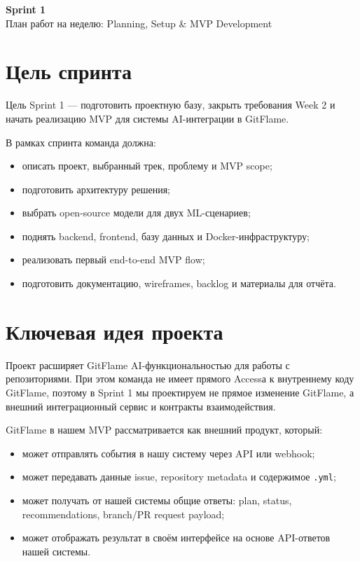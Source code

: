 \documentclass[12pt,a4paper]{article}
\begin{document}

\begin{center}
    {\LARGE \textbf{Sprint 1}}\\[6pt]
    {\large План работ на неделю: Planning, Setup \& MVP Development}
\end{center}

\section{Цель спринта}

Цель Sprint 1 --- подготовить проектную базу, закрыть требования Week 2 и начать реализацию MVP для системы AI-интеграции в GitFlame.

В рамках спринта команда должна:

\begin{itemize}
    \item описать проект, выбранный трек, проблему и MVP scope;
    \item подготовить архитектуру решения;
    \item выбрать open-source модели для двух ML-сценариев;
    \item поднять backend, frontend, базу данных и Docker-инфраструктуру;
    \item реализовать первый end-to-end MVP flow;
    \item подготовить документацию, wireframes, backlog и материалы для отчёта.
\end{itemize}

\section{Ключевая идея проекта}

Проект расширяет GitFlame AI-функциональностью для работы с репозиториями. При этом команда не имеет прямого Accessа к внутреннему коду GitFlame, поэтому в Sprint 1 мы проектируем не прямое изменение GitFlame, а внешний интеграционный сервис и контракты взаимодействия.

GitFlame в нашем MVP рассматривается как внешний продукт, который:

\begin{itemize}
    \item может отправлять события в нашу систему через API или webhook;
    \item может передавать данные issue, repository metadata и содержимое \texttt{.yml};
    \item может получать от нашей системы общие ответы: plan, status, recommendations, branch/PR request payload;
    \item может отображать результат в своём интерфейсе на основе API-ответов нашей системы.
\end{itemize}
\end{document}
